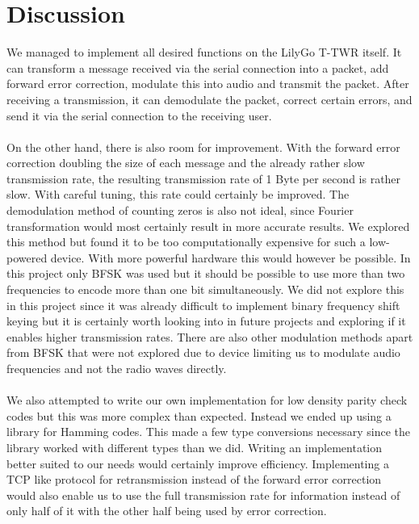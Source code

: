 \chapter{Discussion}

We managed to implement all desired functions on the LilyGo T-TWR itself. It can transform a message received via the serial connection into a packet, add forward error correction, modulate this into audio and transmit the packet. After receiving a transmission, it can demodulate the packet, correct certain errors, and send it via the serial connection to the receiving user.
\\ \\
On the other hand, there is also room for improvement. With the forward error correction doubling the size of each message and the already rather slow transmission rate, the resulting transmission rate of 1 Byte per second is rather slow. With careful tuning, this rate could certainly be improved. The demodulation method of counting zeros is also not ideal, since Fourier transformation would most certainly result in more accurate results. We explored this method but found it to be too computationally expensive for such a low-powered device. With more powerful hardware this would however be possible. In this project only BFSK was used but it should be possible to use more than two frequencies to encode more than one bit simultaneously. We did not explore this in this project since it was already difficult to implement binary frequency shift keying but it is certainly worth looking into in future projects and exploring if it enables higher transmission rates. There are also other modulation methods apart from BFSK that were not explored due to device limiting us to modulate audio frequencies and not the radio waves directly.
\\ \\
We also attempted to write our own implementation for low density parity check codes but this was more complex than expected. Instead we ended up using a library for Hamming codes. This made a few type conversions necessary since the library worked with different types than we did. Writing an implementation better suited to our needs would certainly improve efficiency. Implementing a TCP like protocol for retransmission instead of the forward error correction would also enable us to use the full transmission rate for information instead of only half of it with the other half being used by error correction.
\\ \\ 
